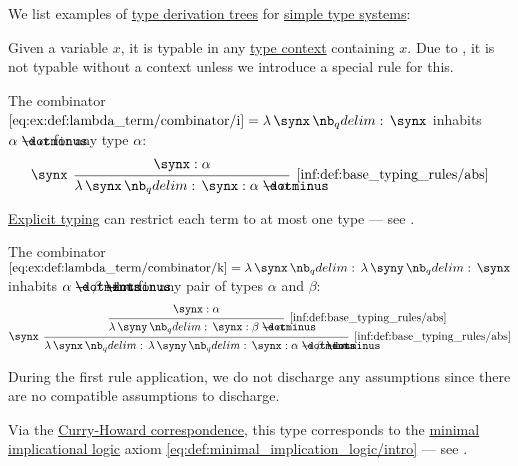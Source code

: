\begin{example}\label{ex:def:type_derivation_tree}
  We list examples of \hyperref[def:type_derivation_tree]{type derivation trees} for \hyperref[def:simple_type_system]{simple type systems}:
  \begin{thmenum}
     Given a variable \( x \), it is typable in any \hyperref[def:type_context]{type context} containing \( x \). Due to , it is not typable without a context unless we introduce a special rule for this.

     The combinator \( \ref{eq:ex:def:lambda_term/combinator/i} = \qabs \synx \synx \) inhabits \( \alpha \synimplies \alpha \) for any type \( \alpha \):
    \begin{equation*}
      \begin{prooftree}
        \hypo{ \synx: \alpha }
        \infer[left label=\( \synx \)]1[\ref{inf:def:base_typing_rules/abs}]{ \qabs \synx \synx: \alpha \synimplies \alpha }
      \end{prooftree}
    \end{equation*}

    \hyperref[rem:explicit_and_implicit_typing]{Explicit typing} can restrict each term to at most one type --- see .

     The combinator \( \ref{eq:ex:def:lambda_term/combinator/k} = \qabs \synx \qabs \syny \synx \) inhabits \( \alpha \synimplies \beta \synimplies \alpha \) for any pair of types \( \alpha \) and \( \beta \):
    \begin{equation*}
      \begin{prooftree}
        \hypo{ \synx: \alpha }
        \infer1[\ref{inf:def:base_typing_rules/abs}]{ \qabs \syny \synx: \beta \synimplies \alpha }
        \infer[left label=\( \synx \)]1[\ref{inf:def:base_typing_rules/abs}]{ \qabs \synx \qabs \syny \synx: \alpha \synimplies \beta \synimplies \alpha }
      \end{prooftree}
    \end{equation*}

    During the first rule application, we do not discharge any assumptions since there are no compatible assumptions to discharge.

    Via the \hyperref[con:curry_howard_correspondence]{Curry-Howard correspondence}, this type corresponds to the \hyperref[def:minimal_implication_logic]{minimal implicational logic} axiom \eqref{eq:def:minimal_implication_logic/intro} --- see .


\end{thmenum}
\end{example}
